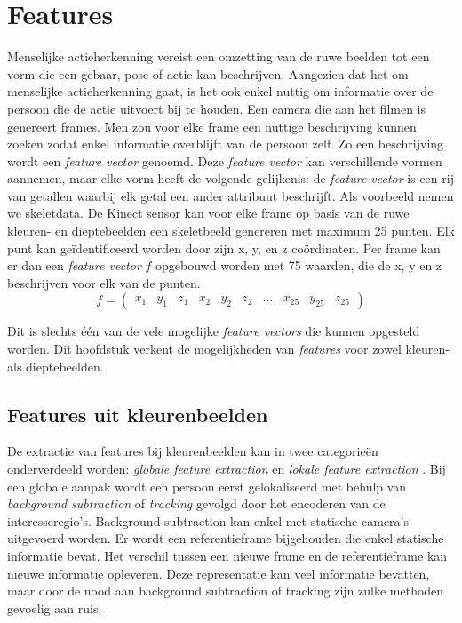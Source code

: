 %

\chapter{Features}
\label{ch:features}
Menselijke actieherkenning vereist een omzetting van de ruwe beelden tot een vorm die een gebaar, pose of actie kan beschrijven. Aangezien dat het om menselijke actieherkenning gaat, is het ook enkel nuttig om informatie over de persoon die de actie uitvoert bij te houden. Een camera die aan het filmen is genereert frames. Men zou voor elke frame een nuttige beschrijving kunnen zoeken zodat enkel informatie overblijft van de persoon zelf. Zo een beschrijving wordt een \textit{feature vector} genoemd. Deze \textit{feature vector} kan verschillende vormen aannemen, maar elke vorm heeft de volgende gelijkenis: de \textit{feature vector} is een rij van getallen waarbij elk getal een ander attribuut beschrijft. Als voorbeeld nemen we skeletdata. De Kinect sensor kan voor elke frame op basis van de ruwe kleuren- en dieptebeelden een skeletbeeld genereren met maximum 25 punten. Elk punt kan geïdentificeerd worden door zijn x, y, en z coördinaten. Per frame kan er dan een \textit{feature vector} $f$ opgebouwd worden met 75 waarden, die de x, y en z beschrijven voor elk van de punten.
$$f =  \begin{pmatrix}
x_1 & y_1&  z_1&  x_2&  y_2&  z_2&  ...&  x_{25} & y_{25}& z_{25}
\end{pmatrix}$$

Dit is slechts één van de vele mogelijke \textit{feature vectors} die kunnen opgesteld worden. Dit hoofdstuk verkent de mogelijkheden van \textit{features} voor zowel kleuren- als dieptebeelden.


\section{Features uit kleurenbeelden}
De extractie van features bij kleurenbeelden kan in twee categorieën onderverdeeld worden: \textit{globale feature extraction} en \textit{lokale feature extraction} \cite{Poppe2010}. Bij een globale aanpak wordt een persoon eerst gelokaliseerd met behulp van \textit{background subtraction} of \textit{tracking} gevolgd door het encoderen van de interesseregio's. Background subtraction kan enkel met statische camera's uitgevoerd worden. Er wordt een referentieframe bijgehouden die enkel statische informatie bevat. Het verschil tussen een nieuwe frame en de referentieframe kan nieuwe informatie opleveren. Deze representatie kan veel informatie bevatten, maar door de nood aan background subtraction of tracking zijn zulke methoden gevoelig aan ruis.

